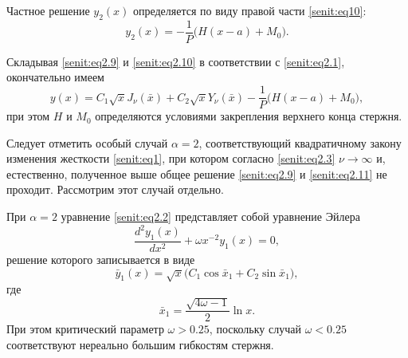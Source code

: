 Частное решение $y_2(x)$ определяется по виду правой части \eqref{senit:eq10}:
\begin{equation}
\label{senit:eq2.10}
y_2 (x)=-\frac{1}{P}\bigl(H(x-a)+M_0\bigr).
\end{equation}

Складывая \eqref{senit:eq2.9} и \eqref{senit:eq2.10} в соответствии с \eqref{senit:eq2.1}, окончательно имеем
\begin{equation}
\label{senit:eq2.11}
y(x)=C_1 \sqrt x J_\nu (\bar x )+C_2 \sqrt x Y_\nu (\bar x
)-\frac{1}{P}\bigl(H(x-a)+M_0\bigr),
\end{equation}
при этом $H$ и $M_0$ определяются условиями закрепления верхнего конца стержня.%

Следует отметить особый случай $\alpha =2$, соответствующий квадратичному закону изменения жесткости \eqref{senit:eq1}, при котором согласно \eqref{senit:eq2.3} $\nu \to \infty $ и, естественно, полученное выше общее решение \eqref{senit:eq2.9} и \eqref{senit:eq2.11} не проходит. 
Рассмотрим этот случай отдельно.

При $\alpha=2$ уравнение \eqref{senit:eq2.2} представляет собой уравнение Эйлера
\begin{equation}
\label{senit:eq2.12}
\frac{d^2 y_1 (x)}{dx^2}+\omega x^{-2}y_1 (x)=0,
\end{equation}
решение которого записывается в виде
\begin{equation}
\label{senit:eq2.16} 
\bar{y}_1(x)=\sqrt x 
\bigl( 
C_1 \cos \bar{x}_1 +C_2 \sin \bar{x}_1 \bigr),
\end{equation}
где
\begin{equation}
\label{senit:eq2/17} 
\bar{x}_1 =\frac{\sqrt {4\omega -1}}{2} \ln x.
\end{equation}
%
%
%
При этом критический параметр  $\omega >0.25$, поскольку случай $\omega <0.25$ соответствуют нереально большим гибкостям стержня.

